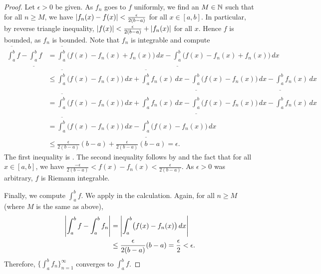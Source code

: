 \begin{proof}
Let $\epsilon > 0$ be given.
As $f_n$ goes to $f$ uniformly, we find an $M \in {\mathbb{N}}$ such that
for all $n \geq M$, we have 
$\left\lvert {f_n(x)-f(x)} \right\rvert < \frac{\epsilon}{2(b-a)}$ for all $x \in [a,b]$.
In particular, by reverse triangle inequality,
$\left\lvert {f(x)} \right\rvert < \frac{\epsilon}{2(b-a)} + \left\lvert {f_n(x)} \right\rvert$ for all $x$.
Hence $f$ is bounded,
as $f_n$ is bounded.
Note that $f_n$ is integrable and compute
\begin{equation*}
\begin{split}
\overline{\int_a^b} f
-
\underline{\int_a^b} f
& =
\overline{\int_a^b} \bigl( f(x) - f_n(x) + f_n(x) \bigr)\,dx
-
\underline{\int_a^b} \bigl( f(x) - f_n(x) + f_n(x) \bigr)\,dx
\\
& \leq
\overline{\int_a^b} \bigl( f(x) - f_n(x) \bigr)\,dx +  \overline{\int_a^b} f_n(x) \,dx
-
\underline{\int_a^b} \bigl( f(x) - f_n(x) \bigr)\,dx -  \underline{\int_a^b} f_n(x) \,dx
\\
& =
\overline{\int_a^b} \bigl( f(x) - f_n(x) \bigr)\,dx +  \int_a^b f_n(x) \,dx
-
\underline{\int_a^b} \bigl( f(x) - f_n(x) \bigr)\,dx -  \int_a^b f_n(x) \,dx
\\
& =
\overline{\int_a^b} \bigl( f(x) - f_n(x) \bigr)\,dx
-
\underline{\int_a^b} \bigl( f(x) - f_n(x) \bigr)\,dx
\\
& \leq
\frac{\epsilon}{2(b-a)} (b-a) + 
\frac{\epsilon}{2(b-a)} (b-a) = \epsilon .
\end{split}
\end{equation*}
The first inequality is .
The second inequality follows by  and 
the fact that for all $x \in [a,b]$, we have
$\frac{-\epsilon}{2(b-a)} < f(x)-f_n(x) < \frac{\epsilon}{2(b-a)}$.
As $\epsilon > 0$ was arbitrary, $f$ is Riemann integrable.

Finally, we compute $\int_a^b f$.  We apply 
in the calculation.  Again, for all $n \geq M$ (where $M$ is the same as above),
\begin{equation*}
\begin{split}
\left\lvert {\int_a^b f - \int_a^b f_n} \right\rvert & = 
\left\lvert { \int_a^b \bigl(f(x) - f_n(x)\bigr)\,dx} \right\rvert
\\
& \leq
\frac{\epsilon}{2(b-a)} (b-a) = \frac{\epsilon}{2} < \epsilon .
\end{split}
\end{equation*}
Therefore, $\bigl\{ \int_a^b f_n \bigr\}_{n=1}^\infty$ converges to $\int_a^b f$.
\end{proof}

